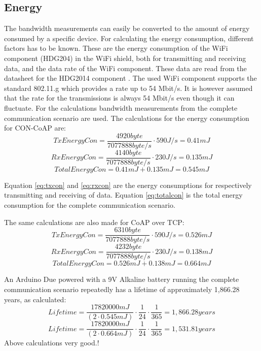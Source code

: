\subsection{Energy}
The bandwidth measurements can easily be converted to the amount of energy consumed by a specific device. For calculating the energy consumption, different factors has to be known. These are the energy consumption of the WiFi component (HDG204) in the WiFi shield, both for transmitting and receiving data, and the data rate of the WiFi component. These data are read from the datasheet for the HDG2014 component \cite{hdg204:datasheet}. The used WiFi component supports the standard 802.11.g which provides a rate up to 54 Mbit/s. It is however assumed that the rate for the transmissions is always 54 Mbit/s even though it can fluctuate. 
For the calculations bandwidth measurements from the complete communication scenario are used. 
The calculations for the energy consumption for CON-CoAP are:
\begin{equation}\label{eq:txcon}
TxEnergyCon = \frac{4920 byte}{7077888 byte/s } \cdot 590 J/s = 0.41 mJ   
\end{equation}
\begin{equation}\label{eq:rxcon}
RxEnergyCon = \frac{4140 byte}{7077888 byte/s } \cdot 230 J/s = 0.135 mJ   
\end{equation}
\begin{equation}\label{eq:totalcon}
TotalEnergyCon = 0.41 mJ + 0.135 mJ =0.545 mJ 
\end{equation}

Equation \ref{eq:txcon} and \ref{eq:rxcon} are the energy consumptions for respectively transmitting and receiving of data. 
Equation \ref{eq:totalcon} is the total energy consumption for the complete communication scenario.

The same calculations are also made for CoAP over TCP:
\begin{equation}\label{eq:tx}
TxEnergyCon = \frac{6310 byte}{7077888 byte/s } \cdot 590 J/s = 0.526 mJ   
\end{equation}
\begin{equation}\label{eq:rx}
RxEnergyCon = \frac{4232 byte}{7077888 byte/s } \cdot 230 J/s = 0.138 mJ   
\end{equation}
\begin{equation}\label{eq:total}
TotalEnergyCon = 0.526 mJ + 0.138 mJ =0.664 mJ 
\end{equation}

An Arduino Due powered with a 9V Alkaline battery running the complete communication scenario repeatedly has a lifetime of approximately 1,866.28 years, as calculated: 
\begin{equation}\label{eq:years}
Lifetime = \frac{17820000 mJ }{(2 \cdot 0.545 mJ)} \cdot \frac{1}{24} \cdot \frac{1}{365} = 1,866.28 years
\end{equation}
\begin{equation}\label{eq:years}
Lifetime = \frac{17820000 mJ }{(2 \cdot 0.664 mJ) } \cdot \frac{1}{24} \cdot \frac{1}{365} = 1,531.81 years
\end{equation}
Above calculations very good.!

